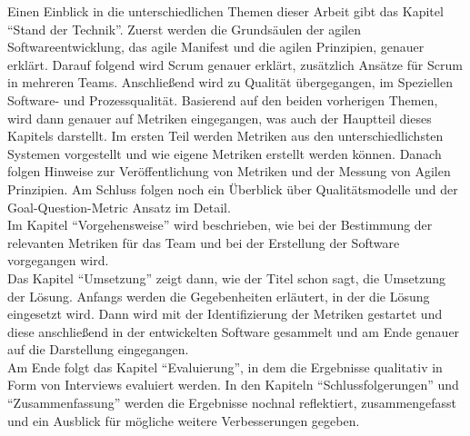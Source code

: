 Einen Einblick in die unterschiedlichen Themen dieser Arbeit gibt das Kapitel ``Stand der Technik''.
Zuerst werden die Grundsäulen der agilen Softwareentwicklung, das agile Manifest und die agilen Prinzipien, genauer erklärt.
Darauf folgend wird Scrum genauer erklärt, zusätzlich Ansätze für Scrum in mehreren Teams.
Anschließend wird zu Qualität übergegangen, im Speziellen Software- und Prozessqualität.
Basierend auf den beiden vorherigen Themen, wird dann genauer auf Metriken eingegangen, was auch der Hauptteil dieses Kapitels darstellt.
Im ersten Teil werden Metriken aus den unterschiedlichsten Systemen vorgestellt und wie eigene Metriken erstellt werden können.
Danach folgen Hinweise zur Veröffentlichung von Metriken und der Messung von Agilen Prinzipien.
Am Schluss folgen noch ein Überblick über Qualitätsmodelle und der Goal-Question-Metric Ansatz im Detail.
\\
Im Kapitel ``Vorgehensweise'' wird beschrieben, wie bei der Bestimmung der relevanten Metriken für das Team und bei der Erstellung der Software vorgegangen wird.
\\
Das Kapitel ``Umsetzung'' zeigt dann, wie der Titel schon sagt, die Umsetzung der Lösung.
Anfangs werden die Gegebenheiten erläutert, in der die Lösung eingesetzt wird.
Dann wird mit der Identifizierung der Metriken gestartet und diese anschließend in der entwickelten Software gesammelt und am Ende genauer auf die Darstellung eingegangen.
\\
Am Ende folgt das Kapitel ``Evaluierung'', in dem die Ergebnisse qualitativ in Form von Interviews evaluiert werden.
In den Kapiteln ``Schlussfolgerungen'' und ``Zusammenfassung'' werden die Ergebnisse nochnal reflektiert, zusammengefasst und ein Ausblick für mögliche weitere Verbesserungen gegeben.
